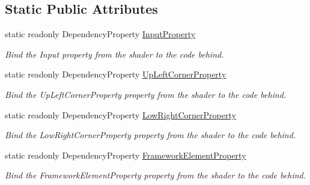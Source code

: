 \subsection*{Static Public Attributes}
\begin{DoxyCompactItemize}
\item 
static readonly Dependency\+Property \mbox{\hyperlink{class_wpf_handler_1_1_u_i_1_1_effects_1_1_rect_blur_effect_a0e5c306c71e975fe32328651ae81e5d0}{Input\+Property}}
\begin{DoxyCompactList}\small\item\em Bind the Input property from the shader to the code behind. \end{DoxyCompactList}\item 
static readonly Dependency\+Property \mbox{\hyperlink{class_wpf_handler_1_1_u_i_1_1_effects_1_1_rect_blur_effect_aaf9984410cb78206a63a2d56dff7b04d}{Up\+Left\+Corner\+Property}}
\begin{DoxyCompactList}\small\item\em Bind the Up\+Left\+Corner\+Property property from the shader to the code behind. \end{DoxyCompactList}\item 
static readonly Dependency\+Property \mbox{\hyperlink{class_wpf_handler_1_1_u_i_1_1_effects_1_1_rect_blur_effect_aeba11586a03ba6bed31ff15d5ba3009f}{Low\+Right\+Corner\+Property}}
\begin{DoxyCompactList}\small\item\em Bind the Low\+Right\+Corner\+Property property from the shader to the code behind. \end{DoxyCompactList}\item 
static readonly Dependency\+Property \mbox{\hyperlink{class_wpf_handler_1_1_u_i_1_1_effects_1_1_rect_blur_effect_a140029690d8c4a72b4b9a003e7a4643c}{Framework\+Element\+Property}}
\begin{DoxyCompactList}\small\item\em Bind the Framework\+Element\+Property property from the shader to the code behind. \end{DoxyCompactList}\end{DoxyCompactItemize}
